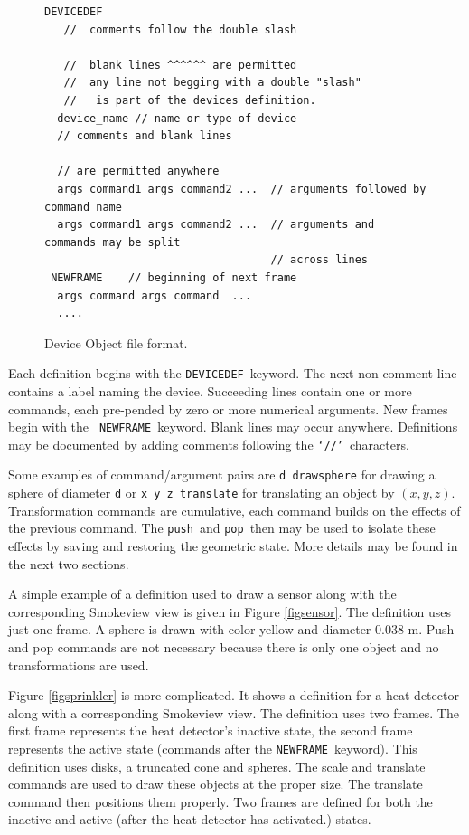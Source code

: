 \documentclass[11pt,twoside]{book}
\newcommand{\figoptions}{hbp}
\begin{document}
\begin{figure}[\figoptions]
{\small
\begin{Verbatim}[frame=single,rulecolor=\color{blue},
framerule=3pt,framesep=1pc,fillcolor=\color{yellow}]
DEVICEDEF
   //  comments follow the double slash

   //  blank lines ^^^^^^ are permitted
   //  any line not begging with a double "slash"
   //   is part of the devices definition.
  device_name // name or type of device
  // comments and blank lines

  // are permitted anywhere
  args command1 args command2 ...  // arguments followed by command name
  args command1 args command2 ...  // arguments and commands may be split
                                   // across lines
 NEWFRAME    // beginning of next frame
  args command args command  ...
  ....
\end{Verbatim}
} \caption{Device Object file format.}
\label{figobjectdef}%
\end{figure}

Each definition begins with the {\tt DEVICEDEF}\ keyword.  The
next non-comment line contains a label naming the device.
Succeeding lines contain one or more commands, each pre-pended by
zero or more numerical arguments.   New frames begin with the {\tt
NEWFRAME}\ keyword.  Blank lines may occur anywhere.  Definitions
may be documented by adding comments following the {\tt `//'}\
characters.

Some examples of command/argument pairs are {\tt d drawsphere} for
drawing a sphere of diameter {\tt d} or {\tt x y z translate} for
translating an object by $(x,y,z)$. Transformation commands are
cumulative, each command builds on the effects of the previous
command.  The {\tt push}\ and {\tt pop}\ then may be used to
isolate these effects by saving and restoring the geometric state.
More details may be found in the next two sections.

A simple example of a definition used to draw a sensor along with
the corresponding Smokeview view is given in Figure
\ref{figsensor}. The definition uses just one frame. A sphere is
drawn with color yellow and diameter 0.038 m. Push and pop commands
are not necessary because there is only one object and no
transformations are used.

Figure \ref{figsprinkler} is more complicated. It shows a
definition for a heat detector along with a corresponding
Smokeview view. The definition uses two frames. The first frame
represents the heat detector's inactive state, the second frame
represents the active state (commands after the {\tt NEWFRAME}\
keyword). This definition uses disks, a truncated cone and spheres.
The scale and translate commands are used to draw these objects at the proper size.
The translate command then positions them properly.  Two frames are defined for both the inactive and active (after the heat
detector has activated.) states.
\end{document}
